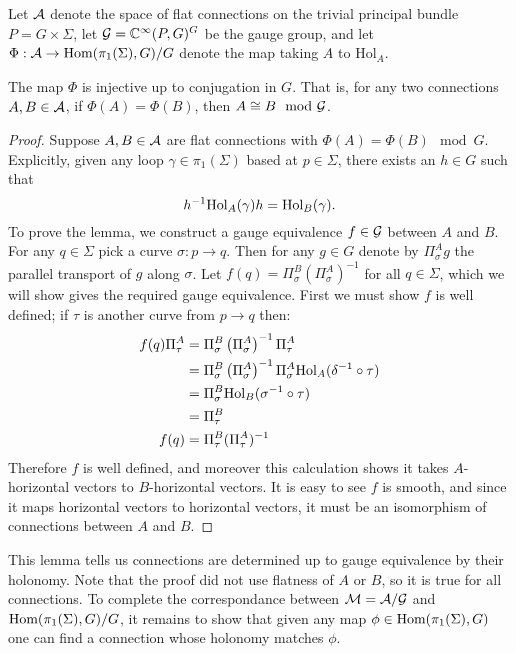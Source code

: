 	Let $\mathcal{A}$ denote the space of flat connections on the trivial principal bundle $P=G\times \Sigma$, let $\mathcal{G} = \mathbb{C}^\infty(P, G)^G$ be the gauge group, and let $\Phi:\mathcal{A} \to \text{Hom}(\pi_1(\Sigma),G)/G$ denote the map taking $A$ to $\text{Hol}_A$. 
	\begin{lemma}
		The map $\Phi$ is injective up to conjugation in $G$. That is, for any two connections $A,B\in \mathcal{A}$, if $\Phi(A) = \Phi(B)$, then $A \cong B \mod {\mathcal{G}}$.
	\end{lemma}
	\begin{proof}
		Suppose $A,B\in \mathcal{A}$ are flat connections with $\Phi(A) = \Phi(B) \mod G$. Explicitly, given any loop $\gamma\in \pi_1(\Sigma)$ based at $p\in \Sigma$, there exists an $h\in G$ such that
		\begin{equation}
			h^{-1}\text{Hol}_A(\gamma)h = \text{Hol}_B(\gamma). 
		\end{equation}
	 	To prove the lemma, we construct a gauge equivalence $f\in \mathcal{G}$ between $A$ and $B$. For any $q\in \Sigma$ pick a curve $\sigma:p\to q$. Then for any $g\in G$ denote by $\Pi_\sigma^Ag$ the parallel transport of $g$ along $\sigma$. Let $f(q)=\Pi_\sigma^B\left(\Pi_\sigma^A\right)^{-1}$ for all $q\in \Sigma$, which we will show gives the required gauge equivalence. First we must show $f$ is well defined; if $\tau$ is another curve from $p\to q$ then:
		\begin{align*}
			f(q)\Pi_\tau^A &= \Pi_\sigma^B\left(\Pi_\sigma^A\right)^{-1}\Pi_\tau^A\\
			&= \Pi_\sigma^B\left(\Pi_\sigma^A\right)^{-1}\Pi_\sigma^A\text{Hol}_A(\delta^{-1}\circ \tau)\\
			&= \Pi_\sigma^B \text{Hol}_B(\sigma^{-1}\circ \tau)\\
			&= \Pi_\tau^B\\
			f(q) &= \Pi_\tau^B (\Pi_\tau^A)^{-1}
		\end{align*}
		Therefore $f$ is well defined, and moreover this calculation shows it takes $A$-horizontal vectors to $B$-horizontal vectors. It is easy to see $f$ is smooth, and since it maps horizontal vectors to horizontal vectors, it must be an isomorphism of connections between $A$ and $B$. 
	\end{proof}
	This lemma tells us connections are determined up to gauge equivalence by their holonomy. Note that the proof did not use flatness of $A$ or $B$, so it is true for all connections. To complete the correspondance between $\mathcal{M} = \mathcal{A}/\mathcal{G}$ and $\text{Hom}(\pi_1(\Sigma),G)/G$, it remains to show that given any map $\phi\in\text{Hom}(\pi_1(\Sigma),G)$ one can find a connection whose holonomy matches $\phi$.
